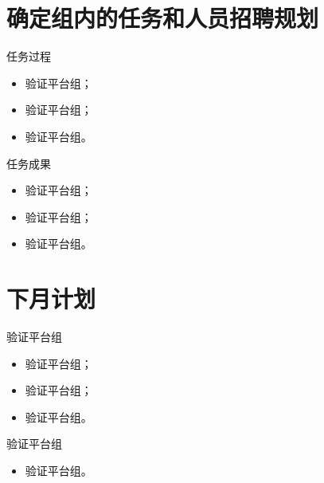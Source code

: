 \documentclass[cjk]{beamer}
\begin{document}
\begin{CJK}{UTF8}{gbsn}
  \section{确定组内的任务和人员招聘规划}

  \begin{frame}
    \begin{block}{任务过程}
      \begin{itemize}
      \item 验证平台组；
      \item 验证平台组；
      \item 验证平台组。
      \end{itemize}
    \end{block}

    \begin{block}{任务成果}
      \begin{itemize}
      \item 验证平台组；
      \item 验证平台组；
      \item 验证平台组。
      \end{itemize}
    \end{block}
  \end{frame}

  \section{下月计划}

  \begin{frame}
    \begin{block}{验证平台组}
      \begin{itemize}
      \item 验证平台组；
      \item 验证平台组；
      \item 验证平台组。
      \end{itemize}
    \end{block}

    \begin{block}{验证平台组}
      \begin{itemize}
      \item 验证平台组。
      \end{itemize}
    \end{block}


\end{frame}
\end{CJK}
\end{document}

